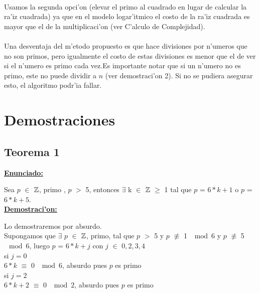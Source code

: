 \paragraph{}
Usamos la segunda opci'on (elevar el primo al cuadrado en lugar de calcular la ra'iz cuadrada)  ya que en 
el modelo logar'itmico el costo de la ra'iz cuadrada es mayor que el de la multiplicaci'on (ver C'alculo 
de Complejidad). 
\paragraph{}
Una desventaja del m'etodo propuesto es que hace divisiones por n'umeros que no son primos, 
pero igualmente el costo de estas divisiones es menor que el de ver si el n'umero es primo cada vez.Es 
importante notar que si un n'umero no es primo, este no puede dividir a $n$ (ver demostraci'on 2). Si 
no se pudiera asegurar esto, el algoritmo podr'ia fallar.

\newpage
\section{Demostraciones}
\subsection{Teorema 1}
\label{demo1}

\textbf{\underline{Enunciado:}\\}

Sea $p$ $\in$ ${\mathbb Z}$, primo , $p$ $>$ 5, entonces $\exists$ k $\in$ ${\mathbb Z}$ $\geq$ 1  tal que $p$ = $6*k+1$ o $p$ = $6*k +5$.\\

\textbf{\underline{Demostraci'on:}\\}

Lo demostraremos por absurdo.\\ 

Supongamos que $\exists$ $p$ $\in$ ${\mathbb Z}$, primo, tal que $p$ $>$ 5 y $p$ $\not\equiv$ 1  $\mod{6}$ y $p$
$\not\equiv$ 5  $\mod{6}$, luego $p$ = $6*k + j$ con $j$ $\in$ ${0,2,3,4}$ \\

si $j = 0$\\

$6*k$ $\equiv$ 0  $\mod{6}$, absurdo pues $p$ es primo\\

si $j = 2$\\

$6*k + 2$ $\equiv$ 0  $\mod{2}$, absurdo pues $p$ es primo \\

